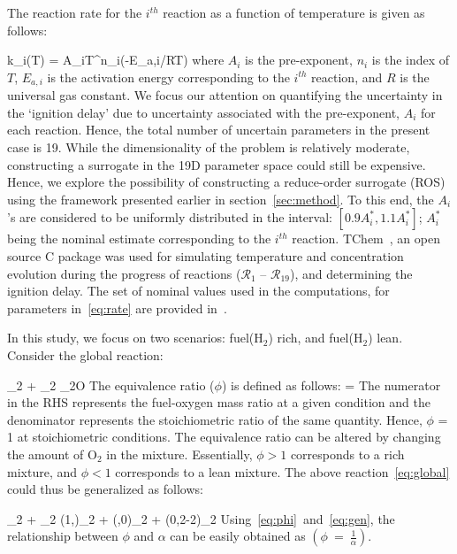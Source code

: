 The reaction rate for the $i^{th}$ reaction as a function of temperature
is given as follows:

\be
k_i(T) = A_iT^{n_i}\exp(-E_{a,i}/RT) 
\label{eq:rate}
\ee
%
where $A_i$ is the pre-exponent, $n_i$ is the index of $T$, $E_{a,i}$
is the activation energy corresponding to the $i^{th}$ reaction, and
$R$ is the universal gas constant. We focus our attention on 
quantifying the uncertainty in the `ignition delay' due to uncertainty
associated with the pre-exponent, $A_i$ for each reaction. Hence, the
total number of uncertain parameters in the present case is 19. 
While the dimensionality of the problem is relatively moderate,
constructing a surrogate in the 19D parameter space could still be
expensive. Hence, we explore the possibility of constructing a
reduce-order surrogate (ROS) using the framework presented earlier
in section~\ref{sec:method}. To this end, the $A_i$'s are considered
to be uniformly distributed in the interval: $[0.9A_i^\ast, 1.1A_i^\ast]$;
$A_i^\ast$ being the nominal estimate corresponding to the $i^{th}$
reaction. TChem~\cite{Safta:2011}, an open source C package was used
for simulating temperature and concentration evolution during the
progress of reactions ($\mathcal{R}_1$ -- $\mathcal{R}_{19}$), and determining
the ignition delay. The set of nominal values used in the computations,
for parameters in~\eqref{eq:rate} are provided in~\cite{Yetter:1991}. 

In this study, we focus on two scenarios: fuel(H$_2$) rich, and fuel(H$_2$)
lean. Consider the global reaction:

_2 + _2 _2O
\label{eq:global}
\ee 
%
The equivalence ratio ($\phi$) is defined as follows:
%
\be
\phi = 
\label{eq:phi}
\ee
%
The numerator in the RHS represents the fuel-oxygen mass ratio at a given condition
and the denominator represents the stoichiometric ratio of the same quantity. Hence,
$\phi$ = 1 at stoichiometric conditions. The equivalence ratio can be altered
by changing the amount of O$_2$ in the mixture. Essentially, $\phi>1$ corresponds to
a rich mixture, and $\phi<1$ corresponds to a lean mixture. The above
reaction~\eqref{eq:global} could thus be generalized as follows:

_2 + \alpha{}_2 \min(1,\alpha)_2 + 
\max(,0)_2 + \max(0,2-2\alpha)_2
\label{eq:gen}
\ee 
%
Using~\eqref{eq:phi}~and~\eqref{eq:gen}, the relationship between $\phi$
and $\alpha$ can be easily obtained as $\left(\phi~=~\frac{1}{\alpha}\right)$.






